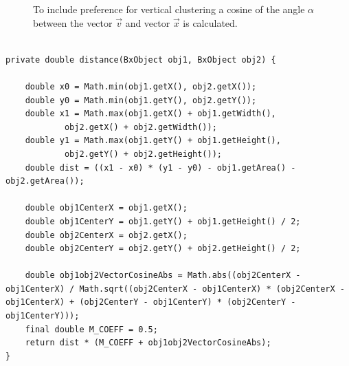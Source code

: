 \begin{figure}[h!]
  \centering
  
  \caption{To include preference for vertical clustering a cosine of the angle $\alpha$ between the vector $\vec{v}$ and vector $\vec{x}$ is calculated.}
  \label{fig:angle_alpha}
\end{figure}
\begin{lstlisting}[caption=Listing of the function measuring distance between two zones or zone groups.]

private double distance(BxObject obj1, BxObject obj2) {

    double x0 = Math.min(obj1.getX(), obj2.getX());
    double y0 = Math.min(obj1.getY(), obj2.getY());
    double x1 = Math.max(obj1.getX() + obj1.getWidth(),
            obj2.getX() + obj2.getWidth());
    double y1 = Math.max(obj1.getY() + obj1.getHeight(),
            obj2.getY() + obj2.getHeight());
    double dist = ((x1 - x0) * (y1 - y0) - obj1.getArea() - obj2.getArea());

    double obj1CenterX = obj1.getX();
    double obj1CenterY = obj1.getY() + obj1.getHeight() / 2;
    double obj2CenterX = obj2.getX();
    double obj2CenterY = obj2.getY() + obj2.getHeight() / 2;

    double obj1obj2VectorCosineAbs = Math.abs((obj2CenterX - obj1CenterX) / Math.sqrt((obj2CenterX - obj1CenterX) * (obj2CenterX - obj1CenterX) + (obj2CenterY - obj1CenterY) * (obj2CenterY - obj1CenterY)));
    final double M_COEFF = 0.5;
    return dist * (M_COEFF + obj1obj2VectorCosineAbs);
}
\end{lstlisting}
